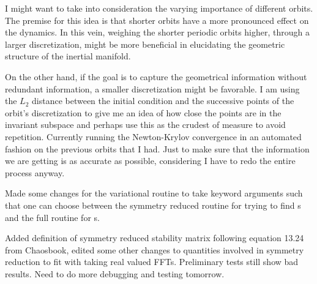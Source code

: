 \begin{description}
{\begin{description}
\color{red}
I might want to take into consideration the varying importance of different orbits.
The premise for this idea is that shorter orbits have a more pronounced effect on the dynamics. In this vein,
weighing the shorter periodic orbits higher, through a larger discretization,
might be more beneficial in elucidating the geometric structure of the inertial manifold.

On the other hand, if the goal is to capture the geometrical information without redundant information,
a smaller discretization
might be favorable. I am using the $L_2$ distance between the initial condition
and the successive points of the orbit's discretization to give me an idea of how close the points are in the invariant
subspace and perhaps use this as the crudest of measure to avoid repetition.
\color{black}
Currently running the Newton-Krylov convergence in an automated fashion on the previous orbits that I had. Just to make
sure that the information we are getting is as accurate as possible, considering I have to redo the entire process anyway.

\item[symmetry reducing]
Made some changes for the variational {\descent} routine to take keyword arguments such that
one can choose between the symmetry reduced routine for trying to find {\rpo}s and the full {\statesp} routine for {\ppo}s.

Added definition of symmetry reduced stability matrix following equation 13.24 from Chaosbook,
edited some other changes to quantities involved in symmetry reduction to fit with taking real valued
FFTs.
Preliminary tests still show bad results. Need to do more debugging and testing tomorrow.
\end{description}
}

\end{description}
